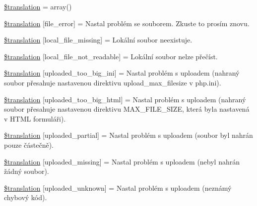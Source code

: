 \begin{DoxyCompactItemize}
\item 
\hyperlink{class_8upload_8cs___c_s_8php_a1f198d410fecc3871ebdd468d343a5e3}{\$translation} = array()
\item 
\hyperlink{class_8upload_8cs___c_s_8php_ac7498e49b9771b04698029aa61c70821}{\$translation} \mbox{[}\textquotesingle{}file\+\_\+error\textquotesingle{}\mbox{]} = \textquotesingle{}Nastal problém se souborem. Zkuste to prosím znovu.\textquotesingle{}
\item 
\hyperlink{class_8upload_8cs___c_s_8php_a6ec3d3a47ab70d77e7aa593e82ead10e}{\$translation} \mbox{[}\textquotesingle{}local\+\_\+file\+\_\+missing\textquotesingle{}\mbox{]} = \textquotesingle{}Lokální soubor neexistuje.\textquotesingle{}
\item 
\hyperlink{class_8upload_8cs___c_s_8php_a60104befef9b241f3a7a6a755618a4b3}{\$translation} \mbox{[}\textquotesingle{}local\+\_\+file\+\_\+not\+\_\+readable\textquotesingle{}\mbox{]} = \textquotesingle{}Lokální soubor nelze přečíst.\textquotesingle{}
\item 
\hyperlink{class_8upload_8cs___c_s_8php_a6a08dcd0d3651fdd098568f6b2f0a42c}{\$translation} \mbox{[}\textquotesingle{}uploaded\+\_\+too\+\_\+big\+\_\+ini\textquotesingle{}\mbox{]} = \textquotesingle{}Nastal problém s uploadem (nahraný soubor přesahuje nastavenou direktivu upload\+\_\+max\+\_\+filesize v php.\+ini).\textquotesingle{}
\item 
\hyperlink{class_8upload_8cs___c_s_8php_a623d5b8b92169f57d7e43458aa911cbb}{\$translation} \mbox{[}\textquotesingle{}uploaded\+\_\+too\+\_\+big\+\_\+html\textquotesingle{}\mbox{]} = \textquotesingle{}Nastal problém s uploadem (nahraný soubor přesahuje nastavenou direktivu M\+A\+X\+\_\+\+F\+I\+L\+E\+\_\+\+S\+I\+Z\+E, která byla nastavená v H\+T\+M\+L formuláři).\textquotesingle{}
\item 
\hyperlink{class_8upload_8cs___c_s_8php_a967c17da21b0a2d3bd65cca3a9ca0ea8}{\$translation} \mbox{[}\textquotesingle{}uploaded\+\_\+partial\textquotesingle{}\mbox{]} = \textquotesingle{}Nastal problém s uploadem (soubor byl nahrán pouze částečně).\textquotesingle{}
\item 
\hyperlink{class_8upload_8cs___c_s_8php_a0cce433260be65f1f35853a6b4b8952b}{\$translation} \mbox{[}\textquotesingle{}uploaded\+\_\+missing\textquotesingle{}\mbox{]} = \textquotesingle{}Nastal problém s uploadem (nebyl nahrán žádný soubor).\textquotesingle{}
\item 
\hyperlink{class_8upload_8cs___c_s_8php_a4a9168e922b827e6a28b5db1c00774ca}{\$translation} \mbox{[}\textquotesingle{}uploaded\+\_\+unknown\textquotesingle{}\mbox{]} = \textquotesingle{}Nastal problém s uploadem (neznámý chybový kód).\textquotesingle{}

\end{DoxyCompactItemize}
